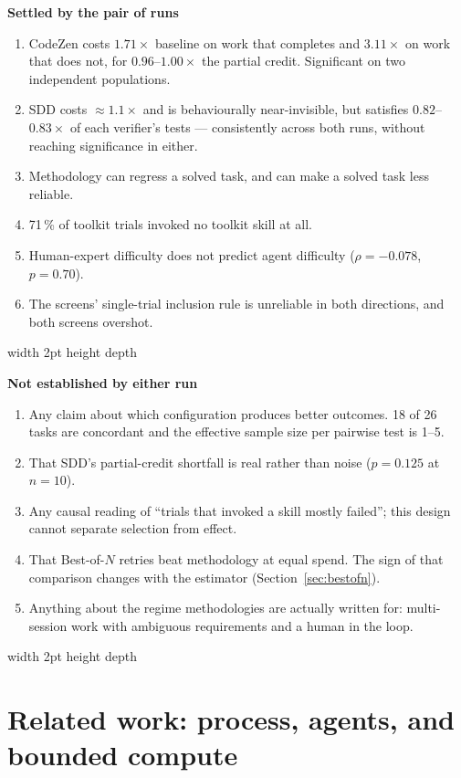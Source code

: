 \documentclass[11pt,a4paper]{article}
\newenvironment{finding}[1]
  {\par\medskip\noindent\begin{lrbox}{\findingbox}%
   \begin{minipage}{\dimexpr\linewidth-2\fboxsep-4pt}%
   \vspace{3pt}\textbf{\color{accent}#1}\par\smallskip\small}
  {\vspace{4pt}\end{minipage}\end{lrbox}%
   \noindent\textcolor{accent}{\vrule width 2pt height \dimexpr\ht\findingbox\relax depth \dimexpr\dp\findingbox\relax}%
   \colorbox{shade}{\usebox{\findingbox}}\par\medskip}
\begin{document}
\begin{finding}{Settled by the pair of runs}
\begin{enumerate}[nosep]
\item CodeZen costs $1.71\times$ baseline on work that completes and $3.11\times$ on work
      that does not, for $0.96$--$1.00\times$ the partial credit. Significant on two
      independent populations.
\item SDD costs $\approx 1.1\times$ and is behaviourally near-invisible, but satisfies
      $0.82$--$0.83\times$ of each verifier's tests --- consistently across both runs,
      without reaching significance in either.
\item Methodology can regress a solved task, and can make a solved task less reliable.
\item 71\,\% of toolkit trials invoked no toolkit skill at all.
\item Human-expert difficulty does not predict agent difficulty ($\rho = -0.078$, $p = 0.70$).
\item The screens' single-trial inclusion rule is unreliable in both directions, and both
      screens overshot.
\end{enumerate}
\end{finding}

\begin{finding}{Not established by either run}
\begin{enumerate}[nosep]
\item Any claim about which configuration produces better outcomes. 18 of 26 tasks are
      concordant and the effective sample size per pairwise test is 1--5.
\item That SDD's partial-credit shortfall is real rather than noise ($p = 0.125$ at $n = 10$).
\item Any causal reading of ``trials that invoked a skill mostly failed''; this design cannot
      separate selection from effect.
\item That Best-of-$N$ retries beat methodology at equal spend. The sign of that comparison
      changes with the estimator (Section~\ref{sec:bestofn}).
\item Anything about the regime methodologies are actually written for: multi-session work
      with ambiguous requirements and a human in the loop.
\end{enumerate}
\end{finding}

\section{Related work: process, agents, and bounded compute}
\label{sec:related}
\end{document}
